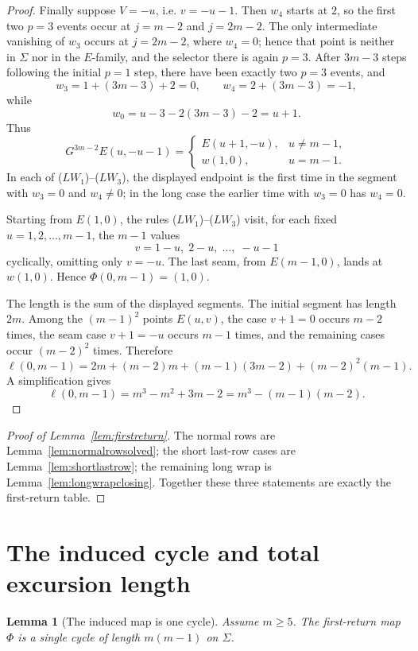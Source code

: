 \documentclass[11pt]{article}
\newtheorem{lemma}{Lemma}
\theoremstyle{definition}
\begin{document}
\begin{proof}
Finally suppose \(V=-u\), i.e. \(v=-u-1\).  Then \(w_4\) starts at \(2\), so the first two \(p=3\)
events occur at \(j=m-2\) and \(j=2m-2\).  The only intermediate vanishing of \(w_3\) occurs at
\(j=2m-2\), where \(w_4=0\); hence that point is neither in \(\Sigma\) nor in the \(E\)-family, and the
selector there is again \(p=3\).  After \(3m-3\) steps following the initial \(p=1\) step, there have
been exactly two \(p=3\) events, and
\[
w_3=1+(3m-3)+2=0,
\qquad
w_4=2+(3m-3)=-1,
\]
while
\[
w_0=u-3-2(3m-3)-2=u+1.
\]
Thus
\[
G^{3m-2}E(u,-u-1)=
\begin{cases}
E(u+1,-u),&u\ne m-1,\\
w(1,0),&u=m-1.
\end{cases} \tag{$LW_3$}
\]
In each of \textup{(\(LW_1\))}--\textup{(\(LW_3\))}, the displayed endpoint is the first time in the
segment with \(w_3=0\) and \(w_4\ne0\); in the long case the earlier time with \(w_3=0\) has
\(w_4=0\).

Starting from \(E(1,0)\), the rules \textup{(\(LW_1\))}--\textup{(\(LW_3\))} visit, for each fixed
\(u=1,2,\ldots,m-1\), the \(m-1\) values
\[
v=1-u,\; 2-u,\; \ldots,\; -u-1
\]
cyclically, omitting only \(v=-u\).  The last seam, from \(E(m-1,0)\), lands at \(w(1,0)\).  Hence
\(\Phi(0,m-1)=(1,0)\).

The length is the sum of the displayed segments.  The initial segment has length \(2m\).  Among the
\((m-1)^2\) points \(E(u,v)\), the case \(v+1=0\) occurs \(m-2\) times, the seam case \(v+1=-u\)
occurs \(m-1\) times, and the remaining cases occur \((m-2)^2\) times.  Therefore
\[
\ell(0,m-1)=2m+(m-2)m+(m-1)(3m-2)+(m-2)^2(m-1).
\]
A simplification gives
\[
\ell(0,m-1)=m^3-m^2+3m-2=m^3-(m-1)(m-2).
\]
\end{proof}




\begin{proof}[Proof of Lemma~\ref{lem:firstreturn}]
The normal rows are Lemma~\ref{lem:normalrowsolved}; the short last-row cases are
Lemma~\ref{lem:shortlastrow}; the remaining long wrap is Lemma~\ref{lem:longwrapclosing}.  Together
these three statements are exactly the first-return table.
\end{proof}

\section{The induced cycle and total excursion length}\label{sec:induced-cycle}

\begin{lemma}[The induced map is one cycle]\label{lem:PhiCycle}
Assume \(m\ge5\).  The first-return map \(\Phi\) is a single cycle of length \(m(m-1)\) on \(\Sigma\).
\end{lemma}
\end{document}
